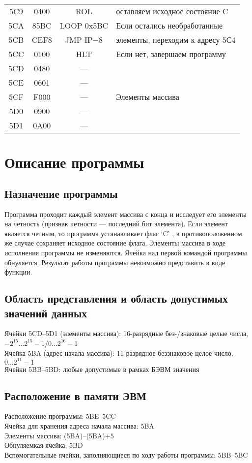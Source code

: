 \begin{center}
\begin{tabular}{|c|c|c|l|}
5C9 & 0400 & ROL & оставляем исходное состояние C\\
5CA & 85BC & LOOP 0x5BC & Если остались необработанные\\
5CB & CEF8 & JMP IP$-$8 & элементы, переходим к адресу 5С4\\
5CC & 0100 & HLT & Если нет, завершаем программу\\
\hline
5CD & 0480 & --- &\\
5CE & 0601 & --- &\\
5CF & F000 & --- & Элементы массива\\
5D0 & 0900 & --- &\\
5D1 & 0A00 & --- &\\
\hline
\end{tabular}
\end{center}

\newpage

\section{Описание программы}
\subsection{Назначение программы}
Программа проходит каждый элемент массива с конца и исследует его элементы на четность (признак четности --- последний бит элемента). Если элемент является четным, то программа устанавливает флаг `C' , в противоположенном же случае сохраняет исходное состояние флага. Элементы массива в ходе исполнения программы не изменяются. Ячейка над первой командой программы обнуляется. Результат работы программы невозможно представить в виде функции.

\subsection{Область представления и область допустимых значений данных}
\noindent Ячейки 5CD--5D1 (элементы массива): 16-разрядные без-/знаковые целые числа, $-2^{15}\ldots2^{15}-1$/$0\ldots2^{16}-1$\\
Ячейка 5BA (адрес начала массива): 11-разрядное беззнаковое целое число, $0\ldots2^{11}-1$\\
Ячейки 5BB--5BD: любые допустимые в рамках БЭВМ значения

\subsection{Расположение в памяти ЭВМ}
\noindent Расположение программы: 5BE--5CC\\
Ячейка для хранения адреса начала массива: 5BA\\
Элементы массива: (5BA)--(5BA)$+5$\\
Обнуляемкая ячейка: 5BD\\
Вспомогательные ячейки, заполняющиеся по ходу работы программы: 5BB--5BC

